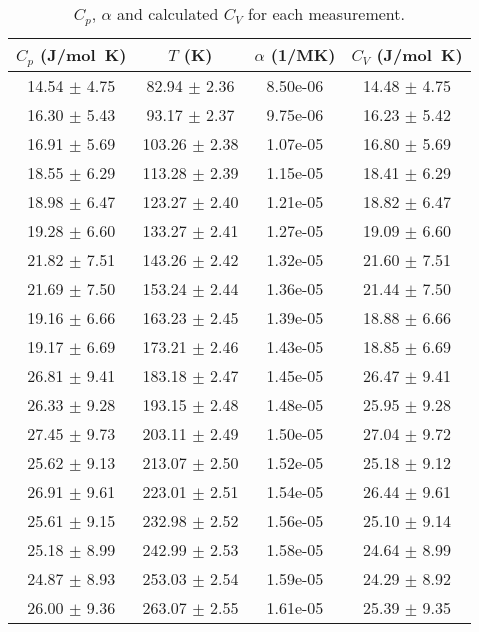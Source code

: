 \begin{table}[H]
  \centering
  \caption{$C_p$, $\alpha$ and calculated $C_V$ for each measurement.}
  \label{tab:heat_capacity_vol}
  \begin{tabular}{cccc}
      \toprule
      $C_p$ (\si{\joule/\mol\kelvin}) & $T$ (\si{\kelvin}) & $\alpha$ (\si{1/\mega\kelvin}) & $C_V$ (\si{\joule/\mol\kelvin})\\
      \midrule
      14.54 $\pm$ 4.75 & 82.94 $\pm$ 2.36  & 8.50e-06 & 14.48 $\pm$ 4.75 \\
      16.30 $\pm$ 5.43 & 93.17 $\pm$ 2.37  & 9.75e-06 & 16.23 $\pm$ 5.42 \\
      16.91 $\pm$ 5.69 & 103.26 $\pm$ 2.38 & 1.07e-05 & 16.80 $\pm$ 5.69 \\
      18.55 $\pm$ 6.29 & 113.28 $\pm$ 2.39 & 1.15e-05 & 18.41 $\pm$ 6.29 \\
      18.98 $\pm$ 6.47 & 123.27 $\pm$ 2.40 & 1.21e-05 & 18.82 $\pm$ 6.47 \\
      19.28 $\pm$ 6.60 & 133.27 $\pm$ 2.41 & 1.27e-05 & 19.09 $\pm$ 6.60 \\
      21.82 $\pm$ 7.51 & 143.26 $\pm$ 2.42 & 1.32e-05 & 21.60 $\pm$ 7.51 \\
      21.69 $\pm$ 7.50 & 153.24 $\pm$ 2.44 & 1.36e-05 & 21.44 $\pm$ 7.50 \\
      19.16 $\pm$ 6.66 & 163.23 $\pm$ 2.45 & 1.39e-05 & 18.88 $\pm$ 6.66 \\
      19.17 $\pm$ 6.69 & 173.21 $\pm$ 2.46 & 1.43e-05 & 18.85 $\pm$ 6.69 \\
      26.81 $\pm$ 9.41 & 183.18 $\pm$ 2.47 & 1.45e-05 & 26.47 $\pm$ 9.41 \\
      26.33 $\pm$ 9.28 & 193.15 $\pm$ 2.48 & 1.48e-05 & 25.95 $\pm$ 9.28 \\
      27.45 $\pm$ 9.73 & 203.11 $\pm$ 2.49 & 1.50e-05 & 27.04 $\pm$ 9.72 \\
      25.62 $\pm$ 9.13 & 213.07 $\pm$ 2.50 & 1.52e-05 & 25.18 $\pm$ 9.12 \\
      26.91 $\pm$ 9.61 & 223.01 $\pm$ 2.51 & 1.54e-05 & 26.44 $\pm$ 9.61 \\
      25.61 $\pm$ 9.15 & 232.98 $\pm$ 2.52 & 1.56e-05 & 25.10 $\pm$ 9.14 \\
      25.18 $\pm$ 8.99 & 242.99 $\pm$ 2.53 & 1.58e-05 & 24.64 $\pm$ 8.99 \\
      24.87 $\pm$ 8.93 & 253.03 $\pm$ 2.54 & 1.59e-05 & 24.29 $\pm$ 8.92 \\
      26.00 $\pm$ 9.36 & 263.07 $\pm$ 2.55 & 1.61e-05 & 25.39 $\pm$ 9.35 \\
      \bottomrule
  \end{tabular}
\end{table}

